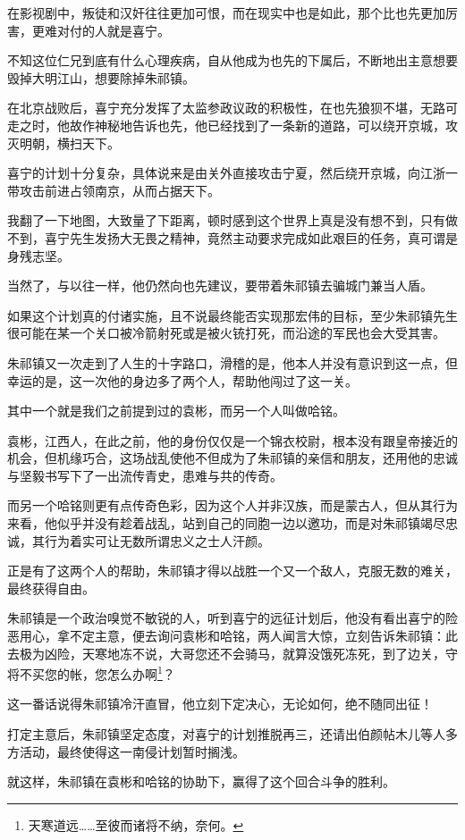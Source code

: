 \begin{multicols}{\theparacolNo}
在影视剧中，叛徒和汉奸往往更加可恨，而在现实中也是如此，那个比也先更加厉害，更难对付的人就是喜宁。

不知这位仁兄到底有什么心理疾病，自从他成为也先的下属后，不断地出主意想要毁掉大明江山，想要除掉朱祁镇。

在北京战败后，喜宁充分发挥了太监参政议政的积极性，在也先狼狈不堪，无路可走之时，他故作神秘地告诉也先，他已经找到了一条新的道路，可以绕开京城，攻灭明朝，横扫天下。

喜宁的计划十分复杂，具体说来是由关外直接攻击宁夏，然后绕开京城，向江浙一带攻击前进占领南京，从而占据天下。

我翻了一下地图，大致量了下距离，顿时感到这个世界上真是没有想不到，只有做不到，喜宁先生发扬大无畏之精神，竟然主动要求完成如此艰巨的任务，真可谓是身残志坚。

当然了，与以往一样，他仍然向也先建议，要带着朱祁镇去骗城门兼当人盾。

如果这个计划真的付诸实施，且不说最终能否实现那宏伟的目标，至少朱祁镇先生很可能在某一个关口被冷箭射死或是被火铳打死，而沿途的军民也会大受其害。

朱祁镇又一次走到了人生的十字路口，滑稽的是，他本人并没有意识到这一点，但幸运的是，这一次他的身边多了两个人，帮助他闯过了这一关。

其中一个就是我们之前提到过的袁彬，而另一个人叫做哈铭。

袁彬，江西人，在此之前，他的身份仅仅是一个锦衣校尉，根本没有跟皇帝接近的机会，但机缘巧合，这场战乱使他不但成为了朱祁镇的亲信和朋友，还用他的忠诚与坚毅书写下了一出流传青史，患难与共的传奇。

而另一个哈铭则更有点传奇色彩，因为这个人并非汉族，而是蒙古人，但从其行为来看，他似乎并没有趁着战乱，站到自己的同胞一边以邀功，而是对朱祁镇竭尽忠诚，其行为着实可让无数所谓忠义之士人汗颜。

正是有了这两个人的帮助，朱祁镇才得以战胜一个又一个敌人，克服无数的难关，最终获得自由。

朱祁镇是一个政治嗅觉不敏锐的人，听到喜宁的远征计划后，他没有看出喜宁的险恶用心，拿不定主意，便去询问袁彬和哈铭，两人闻言大惊，立刻告诉朱祁镇：此去极为凶险，天寒地冻不说，大哥您还不会骑马，就算没饿死冻死，到了边关，守将不买您的帐，您怎么办啊\footnote{天寒道远……至彼而诸将不纳，奈何。}？

这一番话说得朱祁镇冷汗直冒，他立刻下定决心，无论如何，绝不随同出征！

打定主意后，朱祁镇坚定态度，对喜宁的计划推脱再三，还请出伯颜帖木儿等人多方活动，最终使得这一南侵计划暂时搁浅。

就这样，朱祁镇在袁彬和哈铭的协助下，赢得了这个回合斗争的胜利。


\end{multicols}
